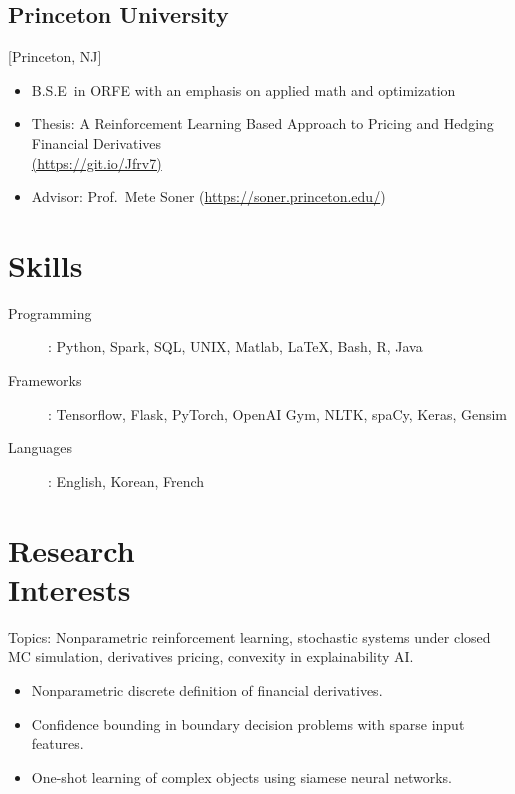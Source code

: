 \documentclass{rkim-resume}
\begin{document}
\subsection{Princeton University}[Princeton, NJ]
\vspace{-\parskip}%
\begin{itemize}[label={}]
  \item B.S.E\ in ORFE with an emphasis on applied math and optimization
  \item Thesis: {A Reinforcement Learning Based Approach to Pricing and Hedging Financial Derivatives}\href{https://github.com/russellkim98/Thesis/blob/master/Russell-Kim-Thesis.pdf}{\\(https://git.io/Jfrv7)}
  \item Advisor: Prof.~Mete Soner (\href{https://soner.princeton.edu/}{https://soner.princeton.edu/})
\end{itemize}
\section{Skills}


\begin{description}
  \item[Programming]: Python, Spark, SQL, UNIX, Matlab, \LaTeX, Bash, R, Java
  \item[Frameworks]: Tensorflow, Flask, PyTorch, OpenAI Gym, NLTK, spaCy, Keras, Gensim
  \item[Languages]: English, Korean, French
\end{description}


\section{Research \\ Interests}

Topics: Nonparametric reinforcement learning, stochastic systems under closed MC simulation, derivatives pricing, convexity in explainability AI.

\begin{itemize}
  \item Nonparametric discrete definition of financial derivatives.
  \item Confidence bounding in boundary decision problems with sparse input features.
  \item One-shot learning of complex objects using siamese neural networks.
\end{itemize}
\end{document}
